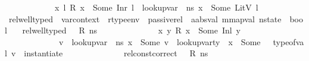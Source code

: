 \begin{isabellebody}
\ \ \ \ \ \ \ \ \ \ \ {\isacharparenleft}{\kern0pt}{\isasymforall}\ x\ l{\isachardot}{\kern0pt}\ R\ x\ {\isacharequal}{\kern0pt}\ Some\ {\isacharparenleft}{\kern0pt}Inr\ l{\isacharparenright}{\kern0pt}\ {\isasymlongrightarrow}\ {\isacharparenleft}{\kern0pt}lookup{\isacharunderscore}{\kern0pt}var\ {\isasymLambda}\ ns\ x\ {\isacharequal}{\kern0pt}\ Some\ {\isacharparenleft}{\kern0pt}LitV\ l{\isacharparenright}{\kern0pt}{\isacharparenright}{\kern0pt}{\isacharparenright}{\kern0pt}{\isachardoublequoteclose}\isanewline
\isanewline
{}\isamarkupfalse%
\ rel{\isacharunderscore}{\kern0pt}well{\isacharunderscore}{\kern0pt}typed\ {\isacharcolon}{\kern0pt}{\isacharcolon}{\kern0pt}\ {\isachardoublequoteopen}var{\isacharunderscore}{\kern0pt}context\ {\isasymRightarrow}\ rtype{\isacharunderscore}{\kern0pt}env\ {\isasymRightarrow}\ passive{\isacharunderscore}{\kern0pt}rel\ {\isasymRightarrow}\ {\isacharparenleft}{\kern0pt}{\isacharprime}{\kern0pt}a{\isacharcolon}{\kern0pt}{\isacharcolon}{\kern0pt}absval{\isacharcomma}{\kern0pt}\ {\isacharprime}{\kern0pt}m{\isacharcolon}{\kern0pt}{\isacharcolon}{\kern0pt}mapval{\isacharparenright}{\kern0pt}\ nstate\ {\isasymRightarrow}\ bool{\isachardoublequoteclose}\isanewline
\ \ \ {\isachardoublequoteopen}rel{\isacharunderscore}{\kern0pt}well{\isacharunderscore}{\kern0pt}typed\ {\isasymLambda}\ {\isasymOmega}\ R\ ns\ {\isacharequal}{\kern0pt}\ {\isacharparenleft}{\kern0pt}\isanewline
\ \ \ \ \ \ \ \ \ \ \ {\isacharparenleft}{\kern0pt}{\isasymforall}\ x\ y{\isachardot}{\kern0pt}\ R\ x\ {\isacharequal}{\kern0pt}\ Some\ {\isacharparenleft}{\kern0pt}Inl\ y{\isacharparenright}{\kern0pt}\ {\isasymlongrightarrow}\ \isanewline
\ \ \ \ \ \ \ \ \ \ \ \ \ {\isacharparenleft}{\kern0pt}{\isasymexists}v\ {\isasymtau}{\isachardot}{\kern0pt}\ lookup{\isacharunderscore}{\kern0pt}var\ {\isasymLambda}\ ns\ x\ {\isacharequal}{\kern0pt}\ Some\ v\ {\isasymand}\ lookup{\isacharunderscore}{\kern0pt}var{\isacharunderscore}{\kern0pt}ty\ {\isasymLambda}\ x\ {\isacharequal}{\kern0pt}\ Some\ {\isasymtau}\ {\isasymand}\ type{\isacharunderscore}{\kern0pt}of{\isacharunderscore}{\kern0pt}val\ v\ {\isacharequal}{\kern0pt}\ instantiate\ {\isasymOmega}\ {\isasymtau}{\isacharparenright}{\kern0pt}{\isacharparenright}{\kern0pt}\ {\isasymand}\isanewline
\ \ \ \ \ \ \ \ \ \ \ {\isacharparenleft}{\kern0pt}rel{\isacharunderscore}{\kern0pt}const{\isacharunderscore}{\kern0pt}correct\ {\isasymLambda}\ {\isasymOmega}\ R\ ns{\isacharparenright}{\kern0pt}{\isacharparenright}{\kern0pt}{\isachardoublequoteclose}\isanewline
\isanewline
{}\isamarkupfalse%

\end{isabellebody}

